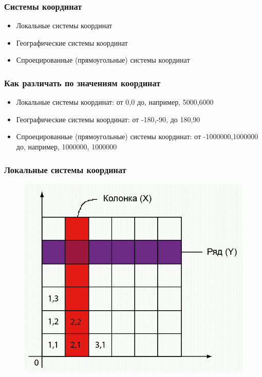 
\begin{frame}
    \frametitle{Системы координат}
    \begin{itemize}
        \item Локальные системы координат
        \item Географические системы координат
        \item Спроецированные (прямоугольные) системы координат
    \end{itemize}
\end{frame}

\begin{frame}
    \frametitle{Как различать по значениям координат}
    \begin{itemize}
        \item Локальные системы координат: от 0,0 до, например, 5000,6000
        \item Географические системы координат: от -180,-90, до 180,90
        \item Спроецированные (прямоугольные) системы координат: от -1000000,1000000 до, например, 1000000, 1000000
    \end{itemize}
\end{frame}


\begin{frame}
    \frametitle{Локальные системы координат}
    \begin{figure}[!ht]
        \begin{center}
            \includegraphics[width=0.6\columnwidth]{./coordinates/img/local_coord}
        \end{center}
    \end{figure}
\end{frame}

